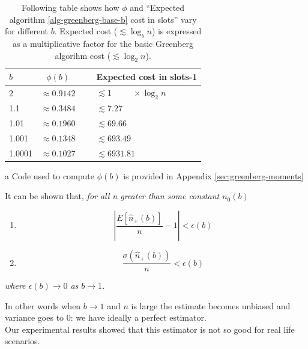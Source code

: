 \documentclass[12pt,a4paper]{report}
\begin{document}
\begin{table}[H]
\caption[\emph{Greenberg}: different $b$ summary]{Following table shows how $\phi$ and ``Expected algorithm \ref{alg-greenberg-base-b} cost in slots'' vary for different $b$. Expected cost ($\lesssim \log_{b}n$) is expressed as a multiplicative factor for the basic Greenberg algorihm cost ($\lesssim \log_{2}n$).}
\label{table:greenberg-b-phi}
\begin{center}
\begin{threeparttable}
\begin{tabular}{lccl}
$b$ & $\phi(b)$\tnote{a} &\,\,\,& Expected cost in slots-1\\
\toprule
2          & $\approx 0.9142$ && $\lesssim 1 \qquad\,\,\, \times \log_{2} n$\\
1.1       & $\approx 0.3484$ && $ \lesssim 7.27$\\
1.01     & $\approx 0.1960$ && $ \lesssim 69.66$\\
1.001   & $\approx 0.1348$ && $ \lesssim 693.49$\\
1.0001 & $\approx 0.1027$ && $ \lesssim 6931.81$\\
\bottomrule
\end{tabular}
\begin{tablenotes}
\item [a] {\footnotesize \smaller Code used to compute $\phi(b)$ is provided in Appendix \ref{sec:greenberg-moments}}
\end{tablenotes}
\end{threeparttable}
\end{center}
\end{table}

It can be shown \cite{greenberg87} that, \emph{for all n greater than some constant $n_{0}(b)$}
\begin{enumerate}
\item \begin{equation} 
		\left |\frac{E[\hat{n}_{+}(b)]}{n}-1 \right | < \epsilon(b) 
	  \end{equation}
\item \begin{equation}
		\frac{\sigma(\hat{n}_{+}(b))}{n}< \epsilon(b)
	\end{equation}
\end{enumerate}
\emph{where $\epsilon(b) \to 0$ as $b \to 1$.}

In other words when $b \to 1$ and $n$ is large the estimate becomes unbiased and variance goes to 0: we have ideally a perfect estimator.\\
Our experimental results showed that this estimator is not so good for real life scenarios.  
\end{document}
